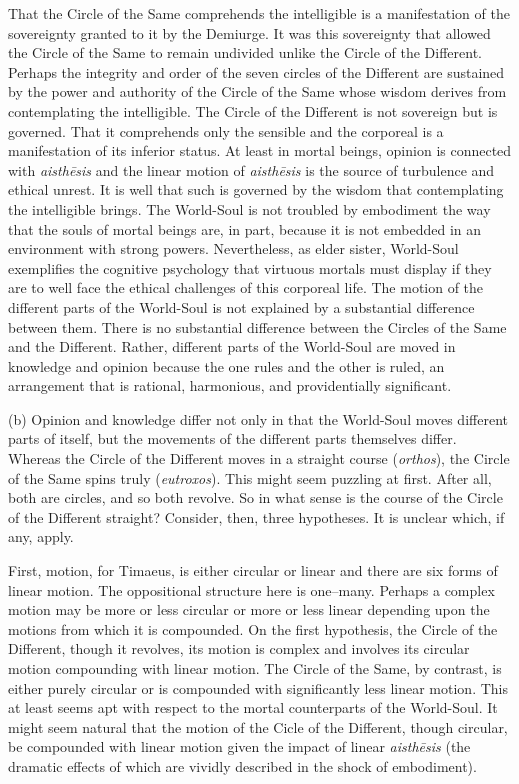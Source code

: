 That the Circle of the Same comprehends the intelligible is a manifestation of the sovereignty granted to it by the Demiurge. It was this sovereignty that allowed the Circle of the Same to remain undivided unlike the Circle of the Different. Perhaps the integrity and order of the seven circles of the Different are sustained by the power and authority of the Circle of the Same whose wisdom derives from contemplating the intelligible. The Circle of the Different is not sovereign but is governed. That it comprehends only the sensible and the corporeal is a manifestation of its inferior status. At least in mortal beings, opinion is connected with \emph{aisthēsis} and the linear motion of \emph{aisthēsis} is the source of turbulence and ethical unrest. It is well that such is governed by the wisdom that contemplating the intelligible brings. The World-Soul is not troubled by embodiment the way that the souls of mortal beings are, in part, because it is not embedded in an environment with strong powers. Nevertheless, as elder sister, World-Soul exemplifies the cognitive psychology that virtuous mortals must display if they are to well face the ethical challenges of this corporeal life. The motion of the different parts of the World-Soul is not explained by a substantial difference between them. There is no substantial difference between the Circles of the Same and the Different. Rather, different parts of the World-Soul are moved in knowledge and opinion because the one rules and the other is ruled, an arrangement that is rational, harmonious, and providentially significant.

(b) Opinion and knowledge differ not only in that the World-Soul moves different parts of itself, but the movements of the different parts themselves differ. Whereas the Circle of the Different moves in a straight course (\emph{orthos}), the Circle of the Same spins truly (\emph{eutroxos}). This might seem puzzling at first. After all, both are circles, and so both revolve. So in what sense is the course of the Circle of the Different straight? Consider, then, three hypotheses. It is unclear which, if any, apply.

First, motion, for Timaeus, is either circular or linear and there are six forms of linear motion. The oppositional structure here is one--many. Perhaps a complex motion may be more or less circular or more or less linear depending upon the motions from which it is compounded. On the first hypothesis, the Circle of the Different, though it revolves, its motion is complex and involves its circular motion compounding with linear motion. The Circle of the Same, by contrast, is either purely circular or is compounded with significantly less linear motion. This at least seems apt with respect to the mortal counterparts of the World-Soul. It might seem natural that the motion of the Cicle of the Different, though circular, be compounded with linear motion given the impact of linear \emph{aisthēsis} (the dramatic effects of which are vividly described in the shock of embodiment).

